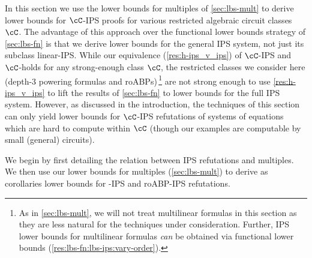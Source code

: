 \documentclass{toc}
\begin{document}
In this section we use the lower bounds for multiples of \autoref{sec:lbs-mult} to derive lower bounds for $\cC$-IPS proofs for various restricted algebraic circuit classes $\cC$.  The advantage of this approach over the functional lower bounds strategy of \autoref{sec:lbs-fn} is that we derive lower bounds for the general IPS system, not just its subclass linear-IPS\@.  While our equivalence (\autoref{res:h-ips_v_ips}) of $\cC$-IPS and $\cC$-\lIPS holds for any strong-enough class $\cC$, the restricted classes we consider here (depth-3 powering formulas and roABPs)\,\footnote{As in \autoref{sec:lbs-mult}, we will not treat multilinear formulas in this section as they are less natural for the techniques under consideration.  Further,  IPS lower bounds for multilinear formulas \emph{can} be obtained via functional lower bounds (\autoref{res:lbs-fn:lbs-ips:vary-order}).} are not strong enough to use \autoref{res:h-ips_v_ips} to lift the results of \autoref{sec:lbs-fn} to lower bounds for the full IPS system.  However, as discussed in the introduction, the techniques of this section can only yield lower bounds for $\cC$-IPS refutations of systems of equations which are hard to compute within $\cC$ (though our examples are computable by small (general) circuits).

We begin by first detailing the relation between IPS refutations and multiples.  We then use our lower bounds for multiples (\autoref{sec:lbs-mult}) to derive as corollaries lower bounds for \sumpowsum-IPS and roABP-IPS refutations.
\end{document}
